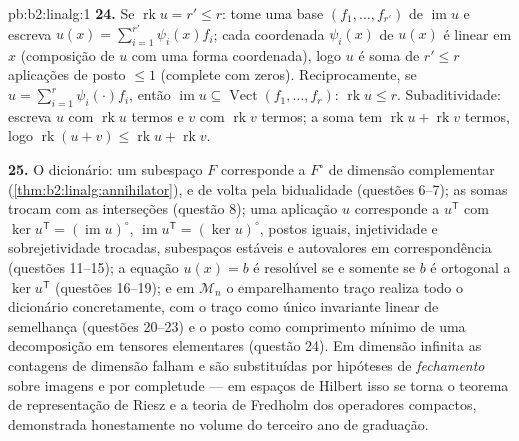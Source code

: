 \begin{solution}{pb:b2:linalg:1}
\textbf{24.} Se $\operatorname{rk} u = r' \leq r$: tome uma base
$(f_1, \dots, f_{r'})$ de $\operatorname{im} u$ e escreva $u(x)
= \sum_{i=1}^{r'} \psi_i(x) f_i$; cada coordenada $\psi_i(x)$ de
$u(x)$ é linear em $x$ (composição de $u$ com uma forma
coordenada), logo $u$ é soma de $r' \leq r$ aplicações de posto $\leq1$ (complete
com zeros). Reciprocamente, se $u = \sum_{i=1}^r \psi_i(\cdot)f_i$,
então $\operatorname{im} u \subseteq \operatorname{Vect}(f_1,
\dots, f_r)$: $\operatorname{rk} u \leq r$. Subaditividade: escreva
$u$ com $\operatorname{rk} u$ termos e $v$ com
$\operatorname{rk} v$ termos; a soma tem $\operatorname{rk} u +
\operatorname{rk} v$ termos, logo $\operatorname{rk}(u + v) \leq
\operatorname{rk} u + \operatorname{rk} v$.

\textbf{25.} O dicionário: um subespaço $F$ corresponde a
$F^\circ$ de dimensão complementar
(\cref{thm:b2:linalg:annihilator}), e de volta pela bidualidade
(questões 6--7); as somas trocam com as interseções (questão 8);
uma aplicação $u$ corresponde a $u^{\mathsf T}$ com $\ker u^{\mathsf T}
= (\operatorname{im}u)^\circ$, $\operatorname{im}u^{\mathsf T} =
(\ker u)^\circ$, postos iguais, injetividade e
sobrejetividade trocadas, subespaços estáveis e autovalores
em correspondência (questões 11--15); a equação $u(x) = b$ é
resolúvel se e somente se $b$ é ortogonal a $\ker u^{\mathsf T}$
(questões 16--19); e em $\mathcal{M}_n$ o emparelhamento traço
realiza todo o dicionário concretamente, com o traço como
único invariante linear de semelhança (questões 20--23) e o posto
como comprimento mínimo de uma decomposição em tensores
elementares (questão 24). Em dimensão infinita as contagens de dimensão
falham e são substituídas por hipóteses de \emph{fechamento} sobre
imagens e por completude --- em espaços de Hilbert isso se torna
o teorema de representação de Riesz e a teoria de Fredholm dos
operadores compactos, demonstrada honestamente no volume do terceiro ano de graduação.
\end{solution}
